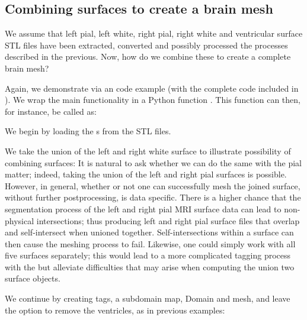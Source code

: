 \subsection{Combining surfaces to create a brain mesh}

We assume that left pial, left white, right pial, right white and
ventricular surface STL files have been extracted, converted and
possibly processed the processes described in the previous. Now, how
do we combine these to create a complete brain mesh? 

Again, we demonstrate via an \svmtk{} code example (with the complete
code included in ). We wrap
the main functionality in a Python function
. This function can then, for
instance, be called as:

We begin by loading the s from the STL files. 

We take the union of the left and right white surface to illustrate
possibility of combining surfaces:
It is natural to ask whether we can do the same with the pial matter;
indeed, taking the union of the left and right pial surfaces is
possible. However, in general, whether or not one can successfully
mesh the joined surface, without further postprocessing, is data
specific.  There is a higher chance that the {\freesurfer}
segmentation process of the left and right pial MRI surface data can
lead to non-physical intersections; thus producing left and right pial
surface files that overlap and self-intersect when unioned together.
Self-intersections within a surface can then cause the meshing process
to fail. Likewise, one could simply work with all five surfaces
separately; this would lead to a more complicated tagging process with
the  but alleviate difficulties that may arise when
computing the union two surface objects.

We continue by creating tags, a subdomain map, Domain and mesh, and leave the
option to remove the ventricles, as in previous examples:

